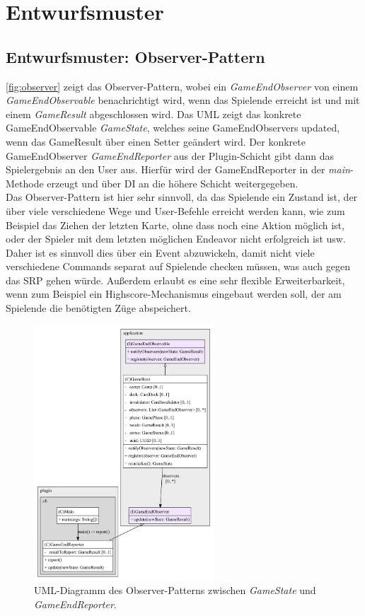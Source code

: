 \chapter{Entwurfsmuster}

\section{Entwurfsmuster: Observer-Pattern}

\autoref{fig:observer} zeigt das Observer-Pattern, wobei ein \textit{GameEndObserver} von einem \textit{GameEndObservable} benachrichtigt 
wird, wenn das Spielende erreicht ist und mit einem \textit{GameResult} abgeschlossen wird. Das UML zeigt das 
konkrete GameEndObservable \textit{GameState}, welches seine GameEndObservers updated, wenn das GameResult über einen 
Setter geändert wird. Der konkrete GameEndObserver \textit{GameEndReporter} aus der Plugin-Schicht gibt dann 
das Spielergebnis an den User aus. Hierfür wird der GameEndReporter in der \textit{main}-Methode erzeugt und über 
DI an die höhere Schicht weitergegeben. \\ 
Das Observer-Pattern ist hier sehr sinnvoll, da das Spielende ein Zustand ist, 
der über viele verschiedene Wege und User-Befehle erreicht werden kann, wie zum Beispiel das Ziehen der letzten 
Karte, ohne dass noch eine Aktion möglich ist, oder der Spieler mit dem letzten möglichen Endeavor nicht erfolgreich ist usw. 
Daher ist es sinnvoll dies über ein Event abzuwickeln, damit nicht viele verschiedene Commands separat auf Spielende checken müssen, 
was auch gegen das SRP gehen würde. Außerdem erlaubt es eine sehr flexible Erweiterbarkeit, wenn zum Beispiel ein 
Highscore-Mechanismus eingebaut werden soll, der am Spielende die benötigten Züge abspeichert.      

\begin{figure}[H]
	\centering
	\includegraphics[width=0.6\textwidth]{Bilder/GameEndObserver_structure.pdf} 
	\caption{UML-Diagramm des Observer-Patterns zwischen \textit{GameState} und \textit{GameEndReporter}.}
	\label{fig:observer}
\end{figure} 

